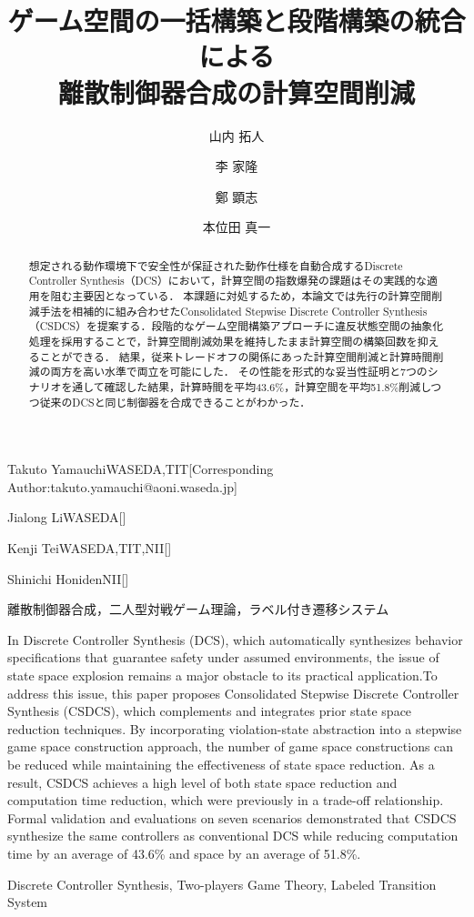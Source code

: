 \documentclass[submit]{ipsj}
\begin{document}
\title{ゲーム空間の一括構築と段階構築の統合による\\離散制御器合成の計算空間削減}



\author{山内 拓人}{Takuto Yamauchi}{WASEDA,TIT}[Corresponding Author:takuto.yamauchi@aoni.waseda.jp]
\author{李 家隆}{Jialong Li}{WASEDA}[]
\author{鄭 顕志}{Kenji Tei}{WASEDA,TIT,NII}[]
\author{本位田 真一}{Shinichi Honiden}{NII}[]

\begin{abstract}
想定される動作環境下で安全性が保証された動作仕様を自動合成するDiscrete Controller Synthesis（DCS）において，計算空間の指数爆発の課題はその実践的な適用を阻む主要因となっている．
本課題に対処するため，本論文では先行の計算空間削減手法を相補的に組み合わせたConsolidated Stepwise Discrete Controller Synthesis（CSDCS）を提案する．段階的なゲーム空間構築アプローチに違反状態空間の抽象化処理を採用することで，計算空間削減効果を維持したまま計算空間の構築回数を抑えることができる．
結果，従来トレードオフの関係にあった計算空間削減と計算時間削減の両方を高い水準で両立を可能にした．
その性能を形式的な妥当性証明と7つのシナリオを通して確認した結果，計算時間を平均43.6\%，計算空間を平均51.8\%削減しつつ従来のDCSと同じ制御器を合成できることがわかった．
\end{abstract}
\begin{jkeyword}
離散制御器合成，二人型対戦ゲーム理論，ラベル付き遷移システム
\end{jkeyword}


\begin{eabstract}
In Discrete Controller Synthesis (DCS), which automatically synthesizes behavior specifications that guarantee safety under assumed environments, the issue of state space explosion remains a major obstacle to its practical application.To address this issue, this paper proposes Consolidated Stepwise Discrete Controller Synthesis (CSDCS), which complements and integrates prior state space reduction techniques. By incorporating violation-state abstraction into a stepwise game space construction approach, the number of game space constructions can be reduced while maintaining the effectiveness of state space reduction. As a result, CSDCS achieves a high level of both state space reduction and computation time reduction, which were previously in a trade-off relationship. Formal validation and evaluations on seven scenarios demonstrated that CSDCS synthesize the same controllers as conventional DCS while reducing computation time by an average of 43.6\% and space by an average of 51.8\%.
\end{eabstract}
\begin{ekeyword}
Discrete Controller Synthesis, Two-players Game Theory, Labeled Transition System
\end{ekeyword}
\end{document}
